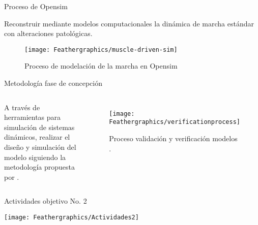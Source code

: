 \documentclass[10pt]{beamer}
\begin{document}
\begin{frame}{Proceso de Opensim}

\begin{block}{Reconstruir mediante modelos computacionales la dinámica de marcha
estándar con alteraciones patológicas.}
\end{block}
\begin{center}
\begin{figure}
\begin{centering}
\texttt{[image: Feathergraphics/muscle-driven-sim]}
\par\end{centering}
\caption{Proceso de modelación de la marcha en Opensim}

\end{figure}
\par\end{center}

\end{frame}

\begin{frame}{Metodología fase de concepción}

\begin{columns}[t]


\column{60 mm}

{\footnotesize{}A través de herramientas para simulación de sistemas
dinámicos, realizar el diseño y simulación del modelo siguiendo la
metodología propuesta por \cite{Hicks2014}.}{\footnotesize \par}

\column{60 mm}

\begin{figure}
\begin{centering}
\texttt{[image: Feathergraphics/verificationprocess]}
\par\end{centering}
\caption{{\tiny{}Proceso validación y verificación modelos \cite{Hicks2014}.}}
\end{figure}

\end{columns}

\end{frame}

\begin{frame}{Actividades objetivo No. 2}

\begin{block}{}

\texttt{[image: Feathergraphics/Actividades2]}
\end{block}
\end{frame}
\end{document}
